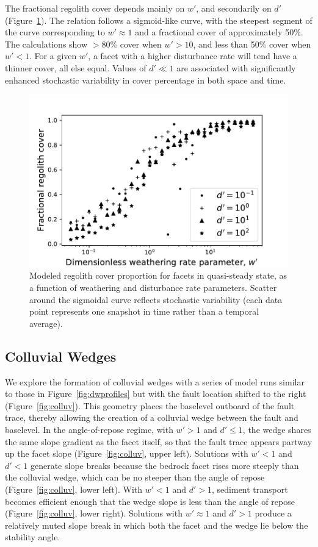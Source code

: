 The fractional regolith cover depends mainly on $w'$, and secondarily on $d'$ (Figure~\ref{fig:regw}). The relation follows a sigmoid-like curve, with the steepest segment of the curve corresponding to $w'\approx 1$ and a fractional cover of approximately 50\%. The calculations show $>$80\% cover when $w'>10$, and less than 50\% cover when $w'<1$. For a given $w'$, a facet with a higher disturbance rate will tend have a thinner cover, all else equal. Values of $d'\ll1$ are associated with significantly enhanced stochastic variability in cover percentage in both space and time.

\begin{figure}[ht!]
\centerline{\includegraphics{Figures/reg_cover_vs_wprime.pdf}}
\caption{Modeled regolith cover proportion for facets in quasi-steady state, as a function of weathering and disturbance rate parameters. Scatter around the sigmoidal curve reflects stochastic variability (each data point represents one snapshot in time rather than a temporal average).}
\label{fig:regw}
\end{figure}


\subsection{Colluvial Wedges}

We explore the formation of colluvial wedges with a series of model runs similar to those in Figure~\ref{fig:dwprofiles} but with the fault location shifted to the right (Figure~\ref{fig:colluv}). This geometry places the baselevel outboard of the fault trace, thereby allowing the creation of a colluvial wedge between the fault and baselevel. In the angle-of-repose regime, with $w'>1$ and $d'\le 1$, the wedge shares the same slope gradient as the facet itself, so that the fault trace appears partway up the facet slope (Figure~\ref{fig:colluv}, upper left). Solutions with $w'<1$ and $d'<1$ generate slope breaks because the bedrock facet rises more steeply than the colluvial wedge, which can be no steeper than the angle of repose (Figure~\ref{fig:colluv}, lower left). With $w'<1$ and $d' > 1$, sediment transport becomes efficient enough that the wedge slope is less than the angle of repose  (Figure~\ref{fig:colluv}, lower right). Solutions with $w' \approx 1$ and $d'>1$ produce a relatively muted slope break in which both the facet and the wedge lie below the stability angle.

